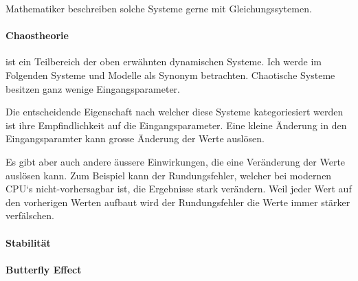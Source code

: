 \documentclass[chaostheorie/chaostheorie.tex]{subfiles}
\begin{document}
	Mathematiker beschreiben solche Systeme gerne mit Gleichungssytemen.
	
	\paragraph{Chaostheorie} ist ein Teilbereich der oben erwähnten dynamischen Systeme. Ich werde im Folgenden Systeme und Modelle als Synonym betrachten. Chaotische Systeme besitzen ganz wenige Eingangsparameter.
	
	Die entscheidende Eigenschaft nach welcher diese Systeme kategoriesiert werden ist ihre Empfindlichkeit auf die Eingangsparameter. Eine kleine Änderung in den Eingangsparamter kann grosse Änderung der Werte auslösen.
	
	Es gibt aber auch andere äussere Einwirkungen, die eine Veränderung der Werte auslösen kann. Zum Beispiel kann der Rundungsfehler, welcher bei modernen CPU‘s nicht-vorhersagbar ist, die Ergebnisse stark verändern. Weil jeder Wert auf den vorherigen Werten aufbaut wird der Rundungsfehler die Werte immer stärker verfälschen.
	
	\paragraph{Stabilität}
	\paragraph{Butterfly Effect}
	
\end{document}
